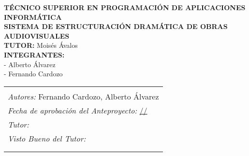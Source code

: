\documentclass[12pt]{article}
\begin{document}
	\begin{center}
		\vspace*{5cm} %

		\textbf{\large TÉCNICO SUPERIOR EN PROGRAMACIÓN DE APLICACIONES INFORMÁTICA}\\[1em]

		\textbf{\large SISTEMA DE ESTRUCTURACIÓN DRAMÁTICA DE OBRAS AUDIOVISUALES}\\[2em]

		\textbf{TUTOR:} Moisés Ávalos\\[2em]

		\textbf{INTEGRANTES:}\\
		- Alberto Álvarez\\
		- Fernando Cardozo

		\vspace*{5cm} %
	\end{center}

	\clearpage %

	\begin{center}
		\vspace*{5cm} %

		\begin{tabular}{|p{15cm}|}
			\hline
			\begin{minipage}[t]{15cm}
				\centering
				\textbf{SISTEMA DE ESTRUCTURACIÓN DRAMÁTICA DE OBRAS AUDIOVISUALES}\\[1em]

				\textit{Autores:} Fernando Cardozo, Alberto Álvarez\\[1em]

				\textit{Fecha de aprobación del Anteproyecto:} \underline{\hspace{2cm}/\hspace{2cm}/\hspace{2cm}}\\[1em]

				\textit{Tutor:} \underline{\hspace{10cm}}\\[1em]

				\raggedleft
				\textit{Visto Bueno del Tutor:} \underline{\hspace{5cm}}\\[1em]
			\end{minipage} \\
			\hline
			\begin{minipage}[t]{15cm}
				\vspace{8em} %
			\end{minipage} \\
			\hline
		\end{tabular}

		\vspace*{5cm} %
	\end{center}
\end{document}
